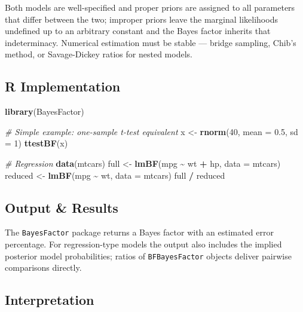 \documentclass[
]{article}
\newenvironment{Shaded}{\begin{snugshade}}{\end{snugshade}}
\newcommand{\AttributeTok}[1]{\textcolor[rgb]{0.13,0.29,0.53}{#1}}
\newcommand{\CommentTok}[1]{\textcolor[rgb]{0.56,0.35,0.01}{\textit{#1}}}
\newcommand{\DecValTok}[1]{\textcolor[rgb]{0.00,0.00,0.81}{#1}}
\newcommand{\FloatTok}[1]{\textcolor[rgb]{0.00,0.00,0.81}{#1}}
\newcommand{\FunctionTok}[1]{\textcolor[rgb]{0.13,0.29,0.53}{\textbf{#1}}}
\newcommand{\NormalTok}[1]{#1}
\newcommand{\OtherTok}[1]{\textcolor[rgb]{0.56,0.35,0.01}{#1}}
\newcommand{\SpecialCharTok}[1]{\textcolor[rgb]{0.81,0.36,0.00}{\textbf{#1}}}
\begin{document}
Both models are well-specified and proper priors are assigned to all
parameters that differ between the two; improper priors leave the
marginal likelihoods undefined up to an arbitrary constant and the Bayes
factor inherits that indeterminacy. Numerical estimation must be stable
--- bridge sampling, Chib's method, or Savage-Dickey ratios for nested
models.

\subsection{R Implementation}\label{r-implementation}

\begin{Shaded}
\begin{Highlighting}[]
\FunctionTok{library}\NormalTok{(BayesFactor)}

\CommentTok{\# Simple example: one{-}sample t{-}test equivalent}
\NormalTok{x }\OtherTok{\textless{}{-}} \FunctionTok{rnorm}\NormalTok{(}\DecValTok{40}\NormalTok{, }\AttributeTok{mean =} \FloatTok{0.5}\NormalTok{, }\AttributeTok{sd =} \DecValTok{1}\NormalTok{)}
\FunctionTok{ttestBF}\NormalTok{(x)}

\CommentTok{\# Regression}
\FunctionTok{data}\NormalTok{(mtcars)}
\NormalTok{full }\OtherTok{\textless{}{-}} \FunctionTok{lmBF}\NormalTok{(mpg }\SpecialCharTok{\textasciitilde{}}\NormalTok{ wt }\SpecialCharTok{+}\NormalTok{ hp, }\AttributeTok{data =}\NormalTok{ mtcars)}
\NormalTok{reduced }\OtherTok{\textless{}{-}} \FunctionTok{lmBF}\NormalTok{(mpg }\SpecialCharTok{\textasciitilde{}}\NormalTok{ wt, }\AttributeTok{data =}\NormalTok{ mtcars)}
\NormalTok{full }\SpecialCharTok{/}\NormalTok{ reduced}
\end{Highlighting}
\end{Shaded}

\subsection{Output \& Results}\label{output-results}

The \texttt{BayesFactor} package returns a Bayes factor with an
estimated error percentage. For regression-type models the output also
includes the implied posterior model probabilities; ratios of
\texttt{BFBayesFactor} objects deliver pairwise comparisons directly.

\subsection{Interpretation}\label{interpretation}
\end{document}
